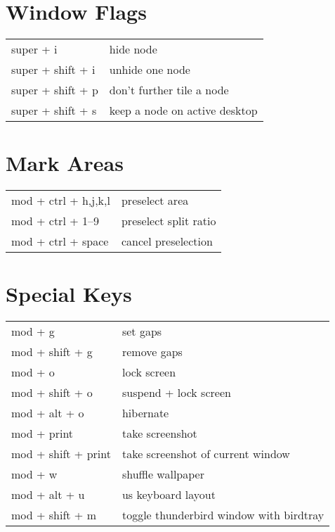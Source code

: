 \documentclass[
    10pt,
    a4paper,
    notitlepage,
]{scrartcl}
\begin{document}
\section{Window Flags}
\begin{tabular}{p{4cm}l}
    super + i           & hide node                         \\
    super + shift + i   & unhide one node                   \\
    super + shift + p   & don't further tile a node         \\
    super + shift + s   & keep a node on active desktop
\end{tabular}

\section{Mark Areas}
\begin{tabular}{p{4cm}l}
    mod + ctrl + h,j,k,l  & preselect area                    \\
    mod + ctrl + 1--9     & preselect split ratio             \\
    mod + ctrl + space    & cancel preselection
\end{tabular}

\section{Special Keys}
\begin{tabular}{p{4cm}l}
    mod + g             & set gaps                                  \\
    mod + shift + g     & remove gaps                               \\
    mod + o             & lock screen                               \\
    mod + shift + o     & suspend + lock screen                     \\
    mod + alt + o       & hibernate                                 \\
    mod + print         & take screenshot                           \\
    mod + shift + print & take screenshot of current window         \\
    mod + w             & shuffle wallpaper                         \\
    mod + alt + u       & us keyboard layout                        \\
    mod + shift + m     & toggle thunderbird window with birdtray
\end{tabular}
\end{document}

